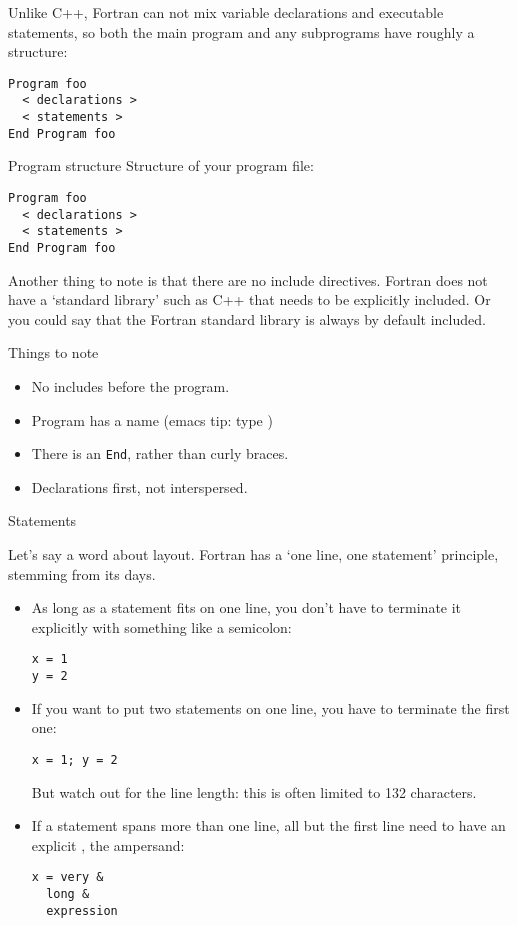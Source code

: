 Unlike C++, Fortran can not mix variable declarations and executable
statements, so both the main program and any subprograms have roughly
a
structure:
\begin{lstlisting}
Program foo
  < declarations >
  < statements >
End Program foo
\end{lstlisting}

\begin{slide}{Program structure}
  \label{sl:programf}
Structure of your program file:
\begin{lstlisting}
Program foo
  < declarations >
  < statements >
End Program foo
\end{lstlisting}
\end{slide}

Another thing to note is that there are no include directives.
Fortran does not have a `standard library' such as C++
that needs to be explicitly included.
Or you could say that the Fortran standard library is always by default included.

\begin{slide}{Things to note}
  \label{sl:programfnotes}
  \begin{itemize}
  \item No includes before the program.
  \item Program has a name (emacs tip: type )
  \item There is an \lstinline{End}, rather than curly braces.
  \item Declarations first, not interspersed.
  \end{itemize}
\end{slide}

 {Statements}

Let's say a word about layout. Fortran has a `one line, one statement'
principle, stemming from its  days.
\begin{itemize}
\item As long as a statement fits on one line, you don't have to
  terminate it explicitly with something like a semicolon:
\begin{lstlisting}
x = 1
y = 2
\end{lstlisting}
\item If you want to put two statements on one line, you have to
  terminate the first one:
\begin{lstlisting}
x = 1; y = 2
\end{lstlisting}
But watch out for the line length: this is often limited to 132 characters.
\item If a statement spans more than one line, all but the first line
  need to have an explicit , the ampersand:
\begin{lstlisting}
x = very &
  long &
  expression
\end{lstlisting}
\end{itemize}

